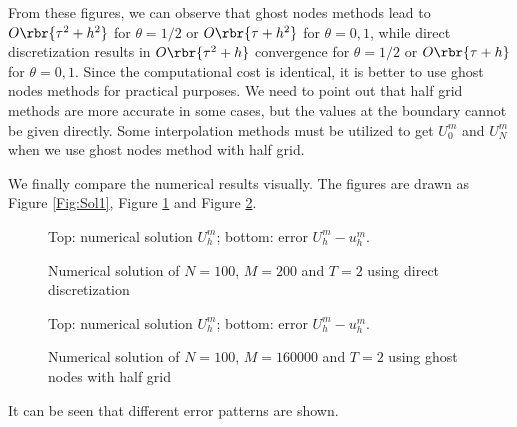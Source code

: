 \documentclass[english, nochinese]{pnote}
\begin{document}
From these figures, we can observe that ghost nodes methods lead to $ O \rbr{ \tau^2 + h^2 } $ for $ \theta = 1 / 2 $ or $ O \rbr{ \tau + h^2 } $ for $ \theta = 0, 1 $, while direct discretization results in $ O \rbr{ \tau^2 + h } $ convergence for $ \theta = 1 / 2 $ or $ O \rbr{ \tau + h } $ for $ \theta = 0, 1 $. Since the computational cost is identical, it is better to use ghost nodes methods for practical purposes. We need to point out that half grid methods are more accurate in some cases, but the values at the boundary cannot be given directly. Some interpolation methods must be utilized to get $U_0^m$ and $U_N^m$ when we use ghost nodes method with half grid.

We finally compare the numerical results visually. The figures are drawn as Figure \ref{Fig:Sol1}, Figure \ref{Fig:Bound1} and Figure \ref{Fig:Bound2}.

\begin{figure}[htbp]
{
\centering





\caption{Numerical solution of $ N = 100 $, $ M = 200 $ and $ T = 2 $ using direct discretization}
\label{Fig:Bound1}
}
{
\footnotesize Top: numerical solution $U_h^m$; bottom: error $ U_h^m - u_h^m $.
}
\end{figure}

\begin{figure}[htbp]
{
\centering





\caption{Numerical solution of $ N = 100 $, $ M = 160000 $ and $ T = 2 $ using ghost nodes with half grid}
\label{Fig:Bound2}
}
{
\footnotesize Top: numerical solution $U_h^m$; bottom: error $ U_h^m - u_h^m $.
}
\end{figure}

It can be seen that different error patterns are shown.
\end{document}
